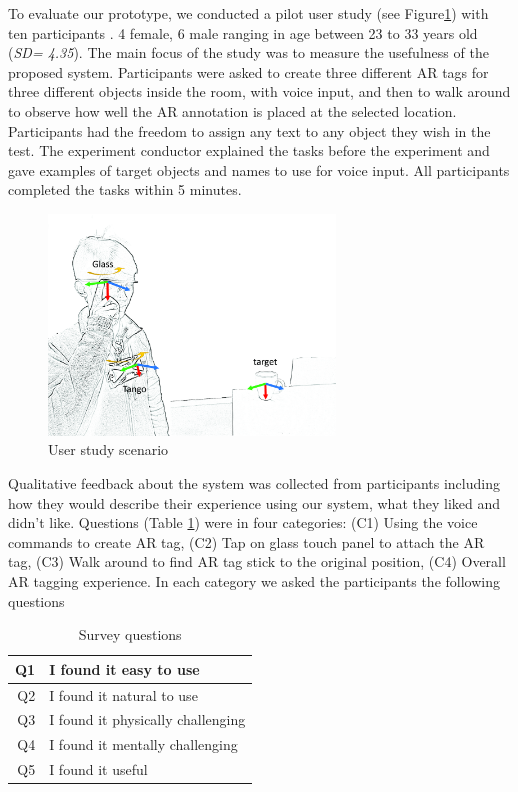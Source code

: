 To evaluate our prototype, we conducted a pilot user study (see Figure\ref{fig:mgia16:scenario}) with ten participants . 4 female, 6 male ranging in age between 23 to 33 years old (\textit{SD= 4.35}). The main focus of the study was to measure the usefulness of the proposed system. Participants were asked to create three different AR tags for three different objects inside the room, with voice input, and then to walk around to observe how well the AR annotation is placed at the selected location. Participants had the freedom to assign any text to any object they wish in the test. The experiment conductor explained the tasks before the experiment and gave examples of target objects and names to use for voice input. All participants completed the tasks within 5 minutes. 

\begin{figure}[ht]
  \centering
  \includegraphics[width=3in]{images/mgia16/axis_lo}
  \caption{User study scenario}
  \label{fig:mgia16:scenario}
\end{figure}

Qualitative feedback about the system was collected from participants including how they would describe their experience using our system, what they liked and didn't like. Questions (Table \ref{table:questions}) were in four categories: (C1) Using the voice commands to create AR tag, (C2) Tap on glass touch panel to attach the AR tag, (C3)  Walk around to find AR tag stick to the original position, (C4) Overall AR tagging experience. In each category we asked the participants the following questions

\begin{table}[ht]
  \centering
	\caption{Survey questions}
    \label{table:questions}
    \begin{tabular}{r l}
    \hline
    Q1 & I found it easy to use \\ \hline
    Q2 & I found it natural to use \\ \hline
    Q3 & I found it physically challenging \\ \hline
    Q4 & I found it mentally challenging \\ \hline
    Q5 & I found it useful \\ \hline
    \end{tabular}
\end{table}

